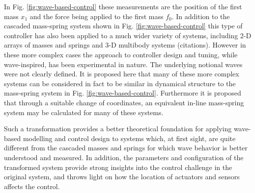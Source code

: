 \documentclass{mbd_fullpaper}
\begin{document}
In Fig. \ref{fig:wave-based-control} these measurements are the position of the first mass $x_1$ and the force being applied to the first mass $f_0$.
In addition to the cascaded mass-spring system shown in Fig. \ref{fig:wave-based-control} this type of controller has also been applied to a much wider variety of systems, including 2-D arrays of masses and springs and 3-D multibody systems (citations). However in these more complex cases the approach to controller design and tuning, while wave-inspired, has been experimental in nature.
The underlying notional waves were not clearly defined.
It is proposed here that many of these more complex systems can be considered in fact to be similar in dynamical structure to the mass-spring system in Fig. \ref{fig:wave-based-control}.
Furthermore it is proposed that through a suitable change of coordinates, an equivalent in-line mass-spring system may be calculated for many of these systems.

Such a transformation provides a better theoretical foundation for applying wave-based modelling and control design to systems which, at first sight, are quite different from the cascaded masses and springs for which wave behavior is better understood and measured.
In addition, the parameters and configuration of the transformed system provide strong insights into the control challenge in the original system, and throws light on how the location of actuators and sensors affects the control.
\end{document}
